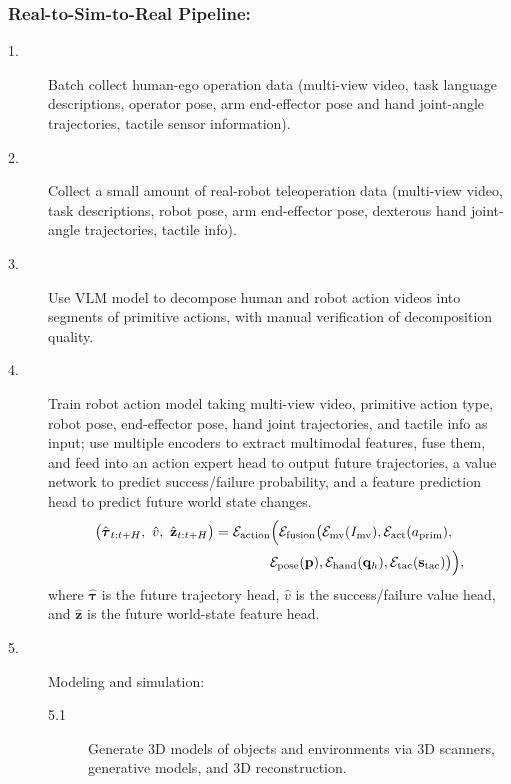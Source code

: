 \documentclass[12pt,a4paper]{article}
\begin{document}
\subsubsection{Real-to-Sim-to-Real Pipeline:}
\begin{description}
\item[1.] Batch collect human-ego operation data (multi-view video, task language descriptions, operator pose, arm end-effector pose and hand joint-angle trajectories, tactile sensor information).
\item[2.] Collect a small amount of real-robot teleoperation data (multi-view video, task descriptions, robot pose, arm end-effector pose, dexterous hand joint-angle trajectories, tactile info).
\item[3.] Use VLM model to decompose human and robot action videos into segments of primitive actions, with manual verification of decomposition quality.
\item[4.] Train robot action model taking multi-view video, primitive action type, robot pose, end-effector pose, hand joint trajectories, and tactile info as input; use multiple encoders to extract multimodal features, fuse them, and feed into an action expert head to output future trajectories, a value network to predict success/failure probability, and a feature prediction head to predict future world state changes.
\begin{equation}
\begin{split}
\bigl(\hat{\boldsymbol{\tau}}_{t:t+H},\ \hat{v},\ \hat{\mathbf{z}}_{t:t+H}\bigr)
&= \mathcal{E}_{\mathrm{action}}\Bigl(\mathcal{E}_{\mathrm{fusion}}\bigl(
\mathcal{E}_{\mathrm{mv}}(I_{\mathrm{mv}}),\mathcal{E}_{\mathrm{act}}(a_{\mathrm{prim}}),\\
&\qquad\qquad \mathcal{E}_{\mathrm{pose}}(\mathbf{p}),\mathcal{E}_{\mathrm{hand}}(\mathbf{q}_h),\mathcal{E}_{\mathrm{tac}}(\mathbf{s}_{\mathrm{tac}})\bigr)\Bigr),
\end{split}
\label{eq:action-model}
\end{equation}
where $\hat{\boldsymbol{\tau}}$ is the future trajectory head, $\hat{v}$ is the success/failure value head, and $\hat{\mathbf{z}}$ is the future world-state feature head.
\item[5.] Modeling and simulation:
\begin{description}
\item[5.1] Generate 3D models of objects and environments via 3D scanners, generative models, and 3D reconstruction.
\begin{description}

\end{description}
\end{description}
\end{description}
\end{document}
